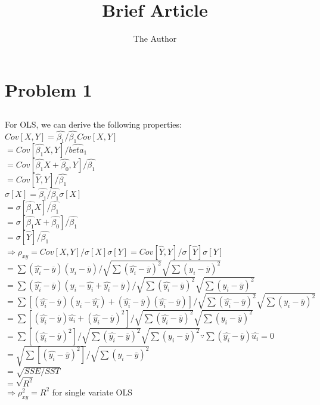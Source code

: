 \documentclass[11pt, oneside]{article}   	%
\title{Brief Article}
\author{The Author}
\begin{document}
\maketitle
\section{Problem 1}
\subsection{}
For OLS, we can derive the following properties:\\
$Cov[X,Y]=\hat{\beta_1}/\hat{\beta_1}Cov[X,Y]$\\
\indent$=Cov[\hat{\beta_1}X,Y]/\hat{beta_1}$\\
\indent$=Cov[\hat{\beta_1}X+\hat{\beta_0},Y]/\hat{\beta_1}$\\
\indent$=Cov[\hat{Y},Y]/\hat{\beta_1}$\\
$\sigma[X]=\hat{\beta_1}/\hat{\beta_1}\sigma[X]$\\
\indent$=\sigma[\hat{\beta_1}X]/\hat{\beta_1}$\\
\indent$=\sigma[\hat{\beta_1}X+\hat{\beta_0}]/\hat{\beta_1}$\\
\indent$=\sigma[\hat{Y}]/\hat{\beta_1}$\\
$\Rightarrow\rho_{xy}=Cov[X,Y]/\sigma[X]\sigma[Y]=Cov[\hat{Y},Y]/\sigma[\hat{Y}]\sigma[Y]$\\
\indent$=\sum(\hat{y_i}-\overline{y})(y_i-\overline{y})/\sqrt{\sum(\hat{y_i}-\overline{y})^2}\sqrt{\sum(y_i-\overline{y})^2}$\\
\indent$=\sum(\hat{y_i}-\overline{y})(y_i-\hat{y_i}+\hat{y_i}-\overline{y})/\sqrt{\sum(\hat{y_i}-\overline{y})^2}\sqrt{\sum(y_i-\overline{y})^2}$\\
\indent$=\sum[(\hat{y_i}-\overline{y})(y_i-\hat{y_i})+(\hat{y_i}-\overline{y})(\hat{y_i}-\overline{y})]/\sqrt{\sum(\hat{y_i}-\overline{y})^2}\sqrt{\sum(y_i-\overline{y})^2}$\\
\indent$=\sum[(\hat{y_i}-\overline{y})\hat{u_i}+(\hat{y_i}-\overline{y})^2]/\sqrt{\sum(\hat{y_i}-\overline{y})^2}\sqrt{\sum(y_i-\overline{y})^2}$\\
\indent$=\sum[(\hat{y_i}-\overline{y})^2]/\sqrt{\sum(\hat{y_i}-\overline{y})^2}\sqrt{\sum(y_i-\overline{y})^2}$\hfill$\because\sum(\hat{y_i}-\overline{y})\hat{u_i}=0$\\
\indent$=\sqrt{\sum[(\hat{y_i}-\overline{y})^2]}/\sqrt{\sum(y_i-\overline{y})^2}$\\
\indent$=\sqrt{SSE/SST}$\\
\indent$=\sqrt{R^2}$\\
$\Rightarrow\rho_{xy}^2=R^2$ for single variate OLS\\
\end{document}
